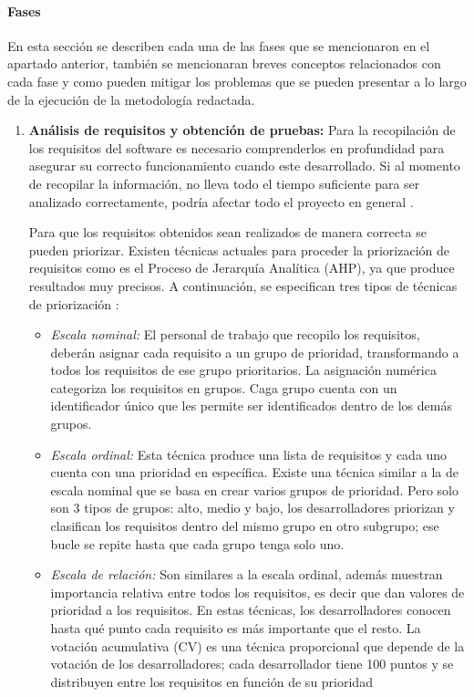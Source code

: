 \paragraph{Fases}

En esta sección se describen cada una de las fases que se mencionaron en el apartado anterior, también se mencionaran breves conceptos relacionados con cada fase y como pueden mitigar los problemas que se pueden presentar a lo largo de la ejecución de la metodología redactada. 

\begin{enumerate}
	\item \textbf{Análisis de requisitos y obtención de pruebas:} Para la recopilación de los requisitos del software es necesario comprenderlos en profundidad para asegurar su correcto funcionamiento cuando este desarrollado. Si al momento de recopilar la información, no lleva todo el tiempo suficiente para ser analizado correctamente, podría afectar todo el proyecto en general \cite{Mohamed}.
	
	Para que los requisitos obtenidos sean realizados de manera correcta se pueden priorizar. Existen técnicas actuales para proceder la priorización de requisitos como es el Proceso de Jerarquía Analítica (AHP), ya que produce resultados muy precisos. A continuación, se especifican tres tipos de técnicas de priorización \cite{Mohamed}:
	\sloppy
	\begin{itemize}
		\item \textit{Escala nominal: } El personal de trabajo que recopilo los requisitos, deberán asignar cada requisito a un grupo de prioridad, transformando a todos los requisitos de ese grupo prioritarios. La asignación numérica categoriza los requisitos en grupos. Caga grupo cuenta con un identificador único que les permite ser identificados dentro de los demás grupos.
		
		\item \textit{Escala ordinal: } Esta técnica produce una lista de requisitos y cada uno cuenta con una prioridad en específica. Existe una técnica similar a la de escala nominal que se basa en crear varios grupos de prioridad. Pero solo son 3 tipos de grupos: alto, medio y bajo, los desarrolladores priorizan y clasifican los requisitos dentro del mismo grupo en otro subgrupo; ese bucle se repite hasta que cada grupo tenga solo uno.
		
		 \item \textit{Escala de relación: }Son similares a la escala ordinal, además muestran importancia relativa entre todos los requisitos, es decir que dan valores de prioridad a los requisitos.	En estas técnicas, los desarrolladores conocen hasta qué punto cada requisito es más importante que el resto. La votación acumulativa (CV) es una técnica proporcional que depende de la votación de los desarrolladores; cada desarrollador tiene 100 puntos y se distribuyen entre los requisitos en función de su prioridad
	\end{itemize}
	

\end{enumerate}
